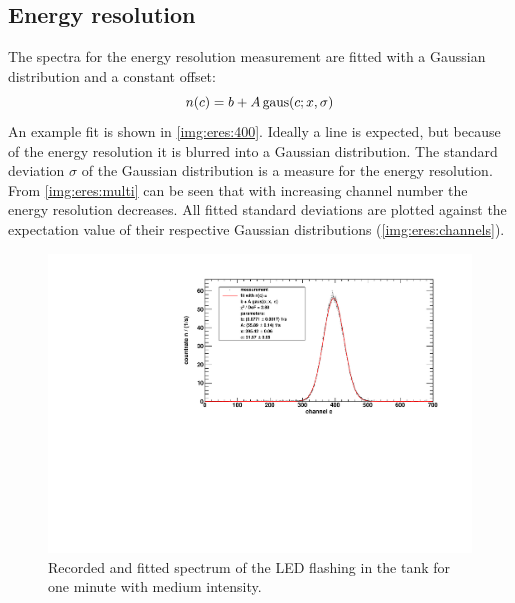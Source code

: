 \subsection{Energy resolution}
The spectra for the energy resolution measurement are fitted with a Gaussian distribution and a constant offset:
\begin{equation}
    n(c) = b + A \operatorname{gaus}(c;x,\sigma)
\end{equation}
An example fit is shown in \autoref{img:eres:400}. Ideally a line is expected, but because of the energy resolution it is blurred into a Gaussian 
distribution. The standard deviation $\sigma$ of the Gaussian distribution is a measure for the energy resolution. 
From \autoref{img:eres:multi} can be seen that with increasing channel number the energy resolution decreases. All fitted standard deviations are 
plotted against the expectation value of their respective Gaussian distributions (\autoref{img:eres:channels}).
\begin{figure}[H]
\begin{center}
  \includegraphics[width=\textwidth]{../img/energieaufloesung_400.pdf}
  \caption{Recorded and fitted spectrum of the LED flashing in the tank for one minute with medium intensity.}
  \label{img:eres:400}
\end{center}
\end{figure}


